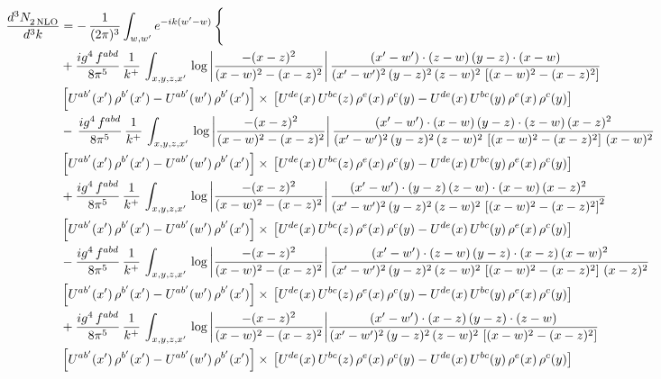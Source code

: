 \documentclass[9pt]{article}
\numberwithin{equation}{section}
\begin{document}
\begin{align}
   \frac{d^{3}N_{2\,\rm NLO}^{\rm}}{d^{3}k}  & =  -\,\frac{1}{(2\pi)^{3}}  \int_{w, w^\prime} e^{-ik(w^\prime-w)}\, \Bigg\{\notag \\ & + \frac{ig^{4}\, f^{abd}}{8\pi^{5}}\, \frac{1}{k^{+}}\, \int_{x,y,z,x'}\,\log{\left|\frac{-(x-z)^{2}}{(x-w)^{2}-(x-z)^{2}}\right|}\,\frac{(x'-w')\cdot (z-w)\, (y-z)\cdot (x-w)}{(x'-w')^{2}\, (y-z)^{2}\, (z-w)^{2}\,\left[(x-w)^{2}-(x-z)^{2}\right]}\, \notag \\ & \left[U^{ab'}(x')\,\rho^{b'}(x')-U^{ab'}(w')\, \rho^{b'}(x')\right]\times\,\left[U^{de}(x)\,U^{bc}(z)\, \rho^{e}(x)\,\rho^{c}(y)-U^{de}(x)\,U^{bc}(y)\,\rho^{e}(x)\,\rho^{c}(y)\right] \notag \\
& -\,\frac{ig^{4}\, f^{abd}}{8\pi^{5}}\, \frac{1}{k^{+}}\, \int_{x,y,z,x'}\,\log{\left|\frac{-(x-z)^{2}}{(x-w)^{2}-(x-z)^{2}}\right|}\,\frac{(x'-w')\cdot (x-w)\, (y-z)\cdot(z-w)\,(x-z)^{2}}{(x'-w')^{2}\, (y-z)^{2}\, (z-w)^{2}\,\left[(x-w)^{2}-(x-z)^{2}\right]\,(x-w)^{2}}\, \notag \\ & \left[U^{ab'}(x')\,\rho^{b'}(x')-U^{ab'}(w')\, \rho^{b'}(x')\right]\times\,\left[U^{de}(x)\,U^{bc}(z)\, \rho^{e}(x)\,\rho^{c}(y)-U^{de}(x)\,U^{bc}(y)\,\rho^{e}(x)\,\rho^{c}(y)\right] \notag \\
& +\frac{ig^{4}\, f^{abd}}{8\pi^{5}}\, \frac{1}{k^{+}}\, \int_{x,y,z,x'}\,\log{\left|\frac{-(x-z)^{2}}{(x-w)^{2}-(x-z)^{2}}\right|}\,\frac{(x'-w')\cdot  (y-z)\, (z-w)\cdot (x-w)\, (x-z)^{2}}{(x'-w')^{2}\, (y-z)^{2}\, (z-w)^{2}\,\left[(x-w)^{2}-(x-z)^{2}\right]^{2}}\, \notag \\ & \left[U^{ab'}(x')\,\rho^{b'}(x')-U^{ab'}(w')\, \rho^{b'}(x')\right]\times\,\left[U^{de}(x)\,U^{bc}(z)\, \rho^{e}(x)\,\rho^{c}(y)-U^{de}(x)\,U^{bc}(y)\,\rho^{e}(x)\,\rho^{c}(y)\right] \notag \\
& - \frac{ig^{4}\, f^{abd}}{8\pi^{5}}\, \frac{1}{k^{+}}\, \int_{x,y,z,x'}\,\log{\left|\frac{-(x-z)^{2}}{(x-w)^{2}-(x-z)^{2}}\right|}\,\frac{(x'-w')\cdot (z-w)\, (y-z)\cdot (x-z)\, (x-w)^{2}}{(x'-w')^{2}\, (y-z)^{2}\, (z-w)^{2}\,\left[(x-w)^{2} - (x-z)^{2}\right]\, (x-z)^{2}}\, \notag \\ & \left[U^{ab'}(x')\,\rho^{b'}(x')-U^{ab'}(w')\, \rho^{b'}(x')\right]\times\,\left[U^{de}(x)\,U^{bc}(z)\, \rho^{e}(x)\,\rho^{c}(y)-U^{de}(x)\,U^{bc}(y)\,\rho^{e}(x)\,\rho^{c}(y)\right] \notag \\
& +\frac{ig^{4}\, f^{abd}}{8\pi^{5}}\, \frac{1}{k^{+}}\, \int_{x,y,z,x'}\,\log{\left|\frac{-(x-z)^{2}}{(x-w)^{2}-(x-z)^{2}}\right|}\frac{(x'-w')\cdot (x-z)\, (y-z)\cdot (z-w)}{(x'-w')^{2}\, (y-z)^{2}\, (z-w)^{2}\,\left[(x-w)^{2} -(x-z)^{2}\right]}\, \notag \\ & \left[U^{ab'}(x')\,\rho^{b'}(x')-U^{ab'}(w')\, \rho^{b'}(x')\right]\times\,\left[U^{de}(x)\,U^{bc}(z)\, \rho^{e}(x)\,\rho^{c}(y)-U^{de}(x)\,U^{bc}(y)\,\rho^{e}(x)\,\rho^{c}(y)\right] \notag \\

\end{align}
\end{document}
